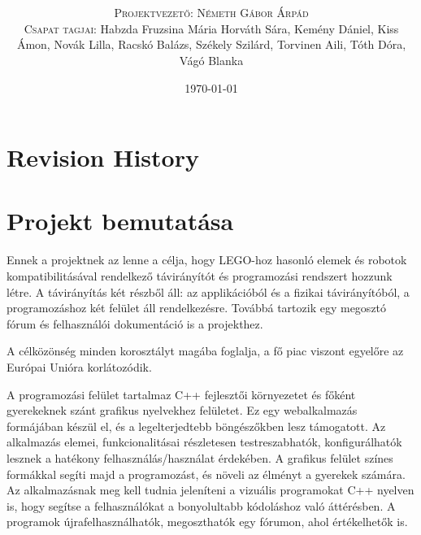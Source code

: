 \documentclass{article}
\title{\textbf{\BoldTitle}\\\Subtitle}
\author{\textsc{\Large Projektvezető: Németh Gábor Árpád} \\ \textsc{Csapat tagjai:} Habzda Fruzsina Mária Horváth Sára, Kemény Dániel, Kiss Ámon, Novák Lilla, Racskó Balázs, Székely Szilárd, Torvinen Aili, Tóth Dóra, Vágó Blanka}
\date{\today}
\begin{document}
\maketitle

\pagebreak
\tableofcontents %

\pagebreak
\section{Revision History}

\begin{versionhistory}
\end{versionhistory}


\pagebreak
\section{Projekt bemutatása}

Ennek a projektnek az lenne a célja, hogy LEGO-hoz hasonló elemek és robotok kompatibilitásával rendelkező távirányítót és programozási rendszert hozzunk létre. A távirányítás két részből áll: az applikációból és a fizikai távirányítóból, a programozáshoz két felület áll rendelkezésre. Továbbá tartozik egy megosztó fórum és felhasználói dokumentáció is a projekthez.
\newline

A célközönség minden korosztályt magába foglalja, a fő piac viszont egyelőre az Európai Unióra korlátozódik.
\newline

A programozási felület tartalmaz C++ fejlesztői környezetet és főként gyerekeknek szánt grafikus nyelvekhez felületet. Ez egy webalkalmazás formájában készül el, és a legelterjedtebb böngészőkben lesz támogatott. Az alkalmazás elemei, funkcionalitásai részletesen testreszabhatók, konfigurálhatók lesznek a hatékony felhasználás/használat érdekében. A grafikus felület színes formákkal segíti majd a programozást, és növeli az élményt a gyerekek számára. Az alkalmazásnak meg kell tudnia jeleníteni a vizuális programokat C++ nyelven is, hogy segítse a felhasználókat a bonyolultabb kódoláshoz való áttérésben.
A programok újrafelhasználhatók, megoszthatók egy fórumon, ahol értékelhetők is.
\newline
\end{document}
